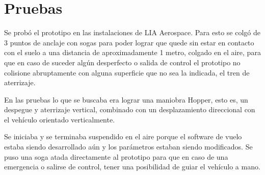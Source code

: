 \section{Pruebas}\label{sec:tests}

Se probó el prototipo en las instalaciones de LIA Aerospace. Para esto se colgó de 3 puntos de anclaje con sogas para poder lograr que quede sin estar en contacto con el suelo a una distancia de aproximadamente 1 metro, colgado en el aire, para que en caso de suceder algún desperfecto o salida de control el prototipo no colisione abruptamente con alguna superficie que no sea la indicada, el tren de aterrizaje.

\medskip

En las pruebas lo que se buscaba era lograr una maniobra Hopper, esto es, un despegue y aterrizaje vertical, combinado con un desplazamiento direccional con el vehículo orientado verticalmente.

\medskip

Se iniciaba y se terminaba suspendido en el aire porque el software de vuelo estaba siendo desarrollado aún y los parámetros estaban siendo modificados.
Se puso una soga atada directamente al prototipo para que en caso de una emergencia o salirse de control, tener una posibilidad de guiar el vehículo a mano.

